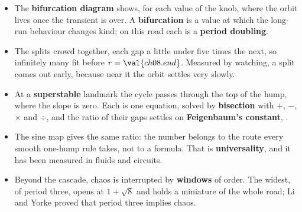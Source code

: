 \begin{summarybox}
\begin{itemize}
\item The \textbf{bifurcation diagram} shows, for each value of the knob,
  where the orbit lives once the transient is over. A \textbf{bifurcation} is
  a value at which the long-run behaviour changes kind; on this road each is
  a \textbf{period doubling}.
\item The splits crowd together, each gap a little under five times the next,
  so infinitely many fit before $r = \val{ch08.end}$. Measured by watching,
  a split comes out early, because near it the orbit settles very slowly.
\item At a \textbf{superstable} landmark the cycle passes through the top of
  the hump, where the slope is zero. Each is one equation, solved by
  \textbf{bisection} with $+$, $-$, $\times$ and $\div$, and the ratio of
  their gaps settles on \textbf{Feigenbaum's constant}, .
\item The sine map gives the same ratio: the number belongs to the route
  every smooth one-hump rule takes, not to a formula. That is
  \textbf{universality}, and it has been measured in fluids and circuits.
\item Beyond the cascade, chaos is interrupted by \textbf{windows} of order.
  The widest, of period three, opens at $1 + \sqrt{8}$ and holds a miniature
  of the whole road; Li and Yorke proved that period three implies chaos.
\end{itemize}
\end{summarybox}

\canyou


